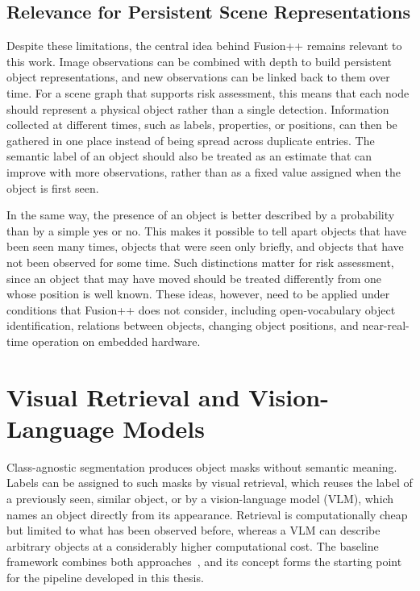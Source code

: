 {{\subsection{Relevance for Persistent Scene Representations}
\label{subsec:tracking_relevance}
{\small
Despite these limitations, the central idea behind Fusion++ remains relevant to this work. Image observations can be combined with depth to build persistent object representations, and new observations can be linked back to them over time. For a scene graph that supports risk assessment, this means that each node should represent a physical object rather than a single detection. Information collected at different times, such as labels, properties, or positions, can then be gathered in one place instead of being spread across duplicate entries. The semantic label of an object should also be treated as an estimate that can improve with more observations, rather than as a fixed value assigned when the object is first seen.

In the same way, the presence of an object is better described by a probability than by a simple yes or no. This makes it possible to tell apart objects that have been seen many times, objects that were seen only briefly, and objects that have not been observed for some time. Such distinctions matter for risk assessment, since an object that may have moved should be treated differently from one whose position is well known. These ideas, however, need to be applied under conditions that Fusion++ does not consider, including open-vocabulary object identification, relations between objects, changing object positions, and near-real-time operation on embedded hardware.
}







\section{Visual Retrieval and Vision-Language Models}
\label{sec:visual_retrieval_vlm}

{\small

Class-agnostic segmentation produces object masks without semantic meaning. Labels can be assigned to such masks by visual retrieval, which reuses the label of a previously seen, similar object, or by a vision-language model (VLM), which names an object directly from its appearance. Retrieval is computationally cheap but limited to what has been observed before, whereas a VLM can describe arbitrary objects at a considerably higher computational cost. The baseline framework combines both approaches~\cite{previous_rsg_thesis}, and its concept forms the starting point for the pipeline developed in this thesis.

}}}
